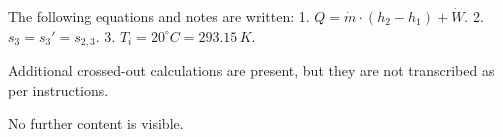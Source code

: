 The following equations and notes are written:  
1. \( Q = \dot{m} \cdot (h_2 - h_1) + \dot{W} \).  
2. \( s_3 = s_3' = s_{2,3} \).  
3. \( T_i = 20^\circ C = 293.15 \, K \).  

Additional crossed-out calculations are present, but they are not transcribed as per instructions.  

No further content is visible.